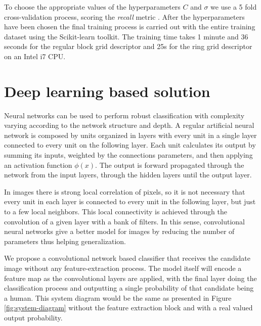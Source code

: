       To choose the appropriate values of the hyperparameters $C$ and $\sigma$ we use a 5 fold cross-validation process, scoring the \textit{recall} metric \cite{evaluationMetrics}. After the hyperparameters have been chosen the final training process is carried out with the entire training dataset using the Scikit-learn \cite{scikit-learn} toolkit. The training time takes 1 minute and 36 seconds for the regular block grid descriptor and 25s for the ring grid descriptor on an Intel i7 CPU.


\section{Deep learning based solution}
\label{sec:deep}

    Neural networks can be used to perform robust classification with complexity varying according to the network structure and depth. A regular artificial neural network is composed by units organized in layers with every unit in a single layer connected to every unit on the following layer. Each unit calculates its output by summing its inputs, weighted by the connections parameters, and then applying an activation function $\phi(x)$. The output is forward propagated through the network from the input layers, through the hidden layers until the output layer.

    In images there is strong local correlation of pixels, so it is not necessary that every unit in each layer is connected to every unit in the following layer, but just to a few local neighbors. This local connectivity is achieved through the convolution of a given layer with a bank of filters. In this sense, convolutional neural networks give a better model for images by reducing the number of parameters thus helping generalization.

    We propose a convolutional network based classifier that receives the candidate image without any feature-extraction process. The model itself will encode a feature map as the convolutional layers are applied, with the final layer doing the classification process and outputting a single probability of that candidate being a human. This system diagram would be the same as presented in Figure \ref{fig:system-diagram} without the feature extraction block and with a real valued output probability.

